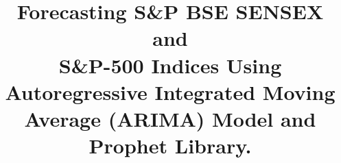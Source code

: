 \documentclass[conference]{IEEEtran}
\begin{document}
\title{Forecasting S\&P BSE SENSEX and \\ S\&P-500 Indices Using Autoregressive Integrated Moving Average (ARIMA) Model and Prophet Library.\\
}

\author{
	

}
\maketitle
\end{document}
